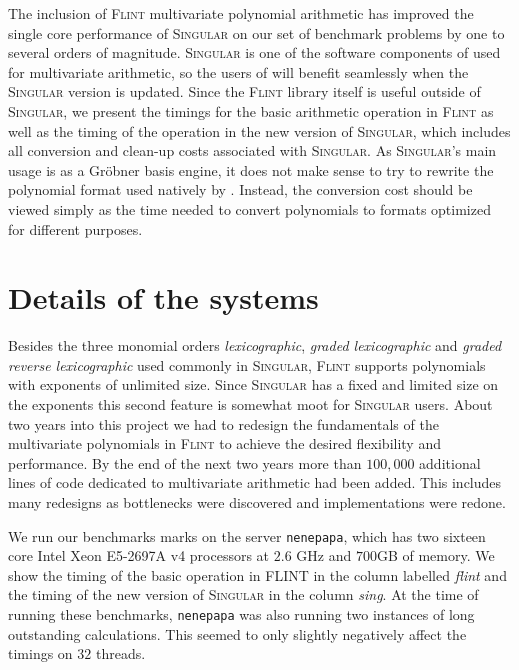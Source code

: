 \documentclass{deliverablereport}
\begin{document}
The inclusion of \textsc{Flint} multivariate polynomial arithmetic has improved the single core performance of \textsc{Singular} on our set of benchmark problems by one to several orders of magnitude. \textsc{Singular} is one of the software components of \Sage used for multivariate arithmetic, so the users of \Sage will benefit seamlessly when the \textsc{Singular} version is updated. Since the \textsc{Flint} library itself is useful outside of \textsc{Singular}, we present the timings for the basic arithmetic operation in \textsc{Flint} as well as the timing of the operation in the new version of \textsc{Singular}, which includes all conversion and clean-up costs associated with \textsc{Singular}. As \textsc{Singular}'s main usage is as a Gr\"obner basis engine, it does not make sense to try to rewrite the polynomial format used natively by . Instead, the conversion cost should be viewed simply as the time needed to convert polynomials to formats optimized for different purposes.

\section{Details of the systems}
Besides the three monomial orders \emph{lexicographic}, \emph{graded lexicographic} and \emph{graded reverse lexicographic} used commonly in \textsc{Singular}, \textsc{Flint} supports polynomials with exponents of unlimited size. Since \textsc{Singular} has a fixed and limited size on the exponents this second feature is somewhat moot for \textsc{Singular} users. About two years into this project we had to redesign the fundamentals of the multivariate polynomials in \textsc{Flint} to achieve the desired flexibility and performance. By the end of the next two years more than $100,000$ additional lines of code dedicated to multivariate arithmetic had been added. This includes many redesigns as bottlenecks were discovered and implementations were redone.

We run our benchmarks marks on the server {\tt nenepapa}, which has two sixteen core Intel Xeon E5-2697A v4 processors at $2.6$ GHz and $700$GB of memory. We show the timing of the basic operation in \textsc{FLINT} in the column labelled \emph{flint} and the timing of the new version of \textsc{Singular} in the column \emph{sing}. At the time of running these benchmarks, {\tt nenepapa} was also running two instances of long outstanding calculations. This seemed to only slightly negatively affect the timings on $32$ threads. 
\end{document}
